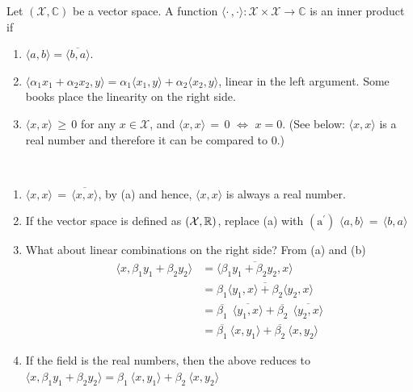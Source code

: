\begin{definition}
    Let $(\mathcal{X}, \mathbb{C})$ be a vector space. A function $\langle \cdot \, , \cdot \rangle: \mathcal{X} \times \mathcal{X} \rightarrow \mathbb{C}$
is an inner product if
    \begin{enumerate}
    \renewcommand{\labelenumi}{(\alph{enumi})}
        \setlength{\itemsep}{.1cm}
        \item $\langle a, b\rangle = \overline{\langle b, a\rangle}$.
        \item $\langle \alpha_1 x_1 + \alpha_2 x_2, y \rangle = \alpha_1 \langle x_1, y \rangle + \alpha_2 \langle x_2, y \rangle$, linear in the left argument. Some books place the linearity on the right side. 
        \item $\langle x, x \rangle \, \ge \, 0$ for any $x \in \mathcal{X}$, and $\langle x, x \rangle\,=\, 0$ $\iff$ $x = 0$. (See below: $\langle x, x \rangle$ is a real number and therefore it can be compared to 0.)
    \end{enumerate}
     
\end{definition}

\begin{rem} \mbox{ }
 \begin{enumerate}
        \item $\langle x, x \rangle\, =\, \overline{\langle x, x \rangle}$, by (a) and hence, $\langle x, x \rangle$ is always a real number.
        \item If the vector space is defined as $(\mathcal{X},\mathbb R)$, replace (a) with $(\text{a}^{'})$ $\langle a, b \rangle \, =\, \langle b, a \rangle$
        \item What about linear combinations on the right side? From (a) and (b)
        \begin{align*}
        \langle x, \beta_1 y_1 + \beta_2 y_2 \rangle &= \overline { \langle \beta_1 y_1 + \beta_2 y_2 ,  x\rangle }\\
        & =\overline {  \beta_1 \langle y_1 ,  x\rangle +  \beta_2  \langle y_2  ,  x\rangle }\\
        & =\overline{ \beta_1} ~~\overline{ \langle y_1 ,  x\rangle}  + \overline{ \beta_2}~~  \overline{ \langle y_2  ,  x\rangle }\\
         & =\overline{ \beta_1} ~\langle x, y_1 \rangle  + \overline{ \beta_2}  ~ \langle x,  y_2 \rangle 
        \end{align*}
        \item If the field is the real numbers, then the above reduces to $ \langle x, \beta_1 y_1 + \beta_2 y_2 \rangle = \beta_1 ~\langle x, y_1 \rangle  +  \beta_2  ~ \langle x,  y_2 \rangle  $
    \end{enumerate}

\end{rem}
   


